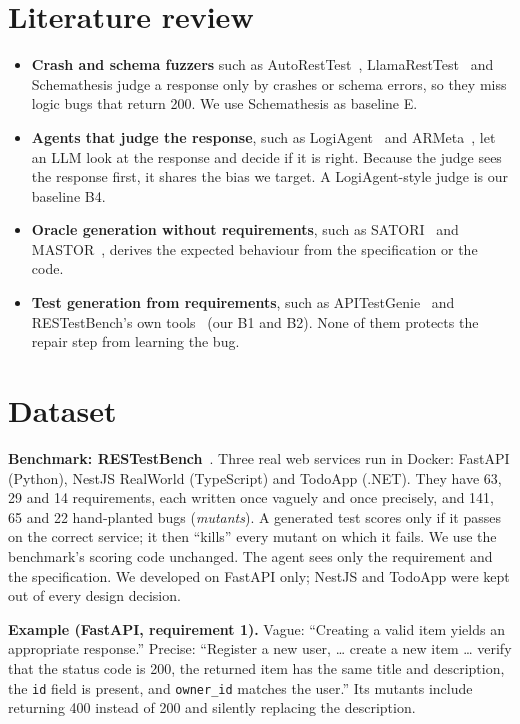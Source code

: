 \documentclass[11pt,a4paper]{article}
\begin{document}
\section{Literature review}
\begin{itemize}
\item \textbf{Crash and schema fuzzers} such as AutoRestTest~\cite{autoresttest}, LlamaRestTest~\cite{llamaresttest} and Schemathesis judge a response only by crashes or schema errors, so they miss logic bugs that return 200. We use Schemathesis as baseline E.
\item \textbf{Agents that judge the response}, such as LogiAgent~\cite{logiagent} and ARMeta~\cite{armeta}, let an LLM look at the response and decide if it is right. Because the judge sees the response first, it shares the bias we target. A LogiAgent-style judge is our baseline B4.
\item \textbf{Oracle generation without requirements}, such as SATORI~\cite{satori} and MASTOR~\cite{mastor}, derives the expected behaviour from the specification or the code.
\item \textbf{Test generation from requirements}, such as APITestGenie~\cite{apitestgenie} and RESTestBench's own tools~\cite{restestbench} (our B1 and B2). None of them protects the repair step from learning the bug.
\end{itemize}

\section{Dataset}
\textbf{Benchmark: RESTestBench}~\cite{restestbench}. Three real web services run in Docker: FastAPI (Python), NestJS RealWorld (TypeScript) and TodoApp (.NET). They have 63, 29 and 14 requirements, each written once vaguely and once precisely, and 141, 65 and 22 hand-planted bugs (\emph{mutants}). A generated test scores only if it passes on the correct service; it then ``kills'' every mutant on which it fails. We use the benchmark's scoring code unchanged. The agent sees only the requirement and the specification. We developed on FastAPI only; NestJS and TodoApp were kept out of every design decision.

\textbf{Example (FastAPI, requirement 1).} Vague: ``Creating a valid item yields an appropriate response.'' Precise: ``Register a new user, \ldots{} create a new item \ldots{} verify that the status code is 200, the returned item has the same title and description, the \texttt{id} field is present, and \texttt{owner\_id} matches the user.'' Its mutants include returning 400 instead of 200 and silently replacing the description.
\end{document}
